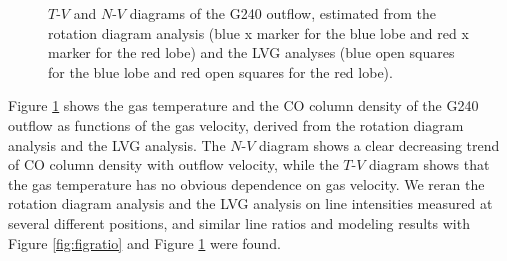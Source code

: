 \begin{figure}[!tbp]
\caption{$T$-$V$ and $N$-$V$ diagrams of the G240 outflow, estimated from the rotation diagram analysis (blue x marker for the blue lobe and red x marker for the red lobe) and the LVG analyses (blue open squares for the blue lobe and red open squares for the red lobe). \label{fig:figrelation}}
\end{figure}

Figure \ref{fig:figrelation} shows the gas temperature and the CO column density of the G240 outflow as functions of the gas velocity, derived from the rotation diagram analysis and the LVG analysis. The $N$-$V$ diagram shows a clear decreasing trend of CO column density with outflow velocity, while the $T$-$V$ diagram shows that the gas temperature has no obvious dependence on gas velocity. We reran the rotation diagram analysis and the LVG analysis on line intensities measured at several different positions, and similar line ratios and modeling results with Figure \ref{fig:figratio} and Figure \ref{fig:figrelation} were found. 




